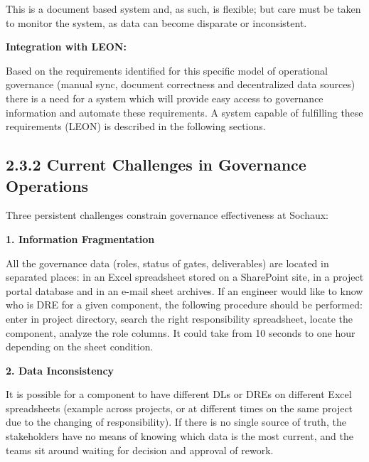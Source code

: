 \vspace{0.2cm}

\noindent This is a document based system and, as such, is flexible; but care must be taken to monitor the system, as data can become disparate or inconsistent.

\vspace{0.3cm}

\noindent\textbf{Integration with LEON:}

Based on the requirements identified for this specific model of operational governance (manual sync, document correctness and decentralized data sources) there is a need for a system which will provide easy access to governance information and automate these requirements. A system capable of fulfilling these requirements (LEON) is described in the following sections.

\subsection*{\textcolor[HTML]{003D99}{2.3.2 Current Challenges in Governance Operations}}

Three persistent challenges constrain governance effectiveness at Sochaux:

\vspace{0.2cm}

\noindent\textbf{1. Information Fragmentation}

All the governance data (roles, status of gates, deliverables) are located in separated places: in an Excel spreadsheet stored on a SharePoint site, in a project portal database and in an e-mail sheet archives. If an engineer would like to know who is DRE for a given component, the following procedure should be performed: enter in project directory, search the right responsibility spreadsheet, locate the component, analyze the role columns. It could take from 10 seconds to one hour depending on the sheet condition.
\vspace{0.2cm}

\noindent\textbf{2. Data Inconsistency}

It is possible for a component to have different DLs or DREs on different Excel spreadsheets (example across projects, or at different times on the same project due to the changing of responsibility). If there is no single source of truth, the stakeholders have no means of knowing which data is the most current, and the teams sit around waiting for decision and approval of rework.
\vspace{0.2cm}


